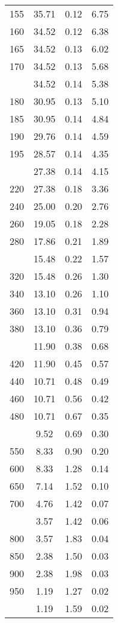 \begin{table}[ht]
\begin{tabular}{lccc}
  155 & 35.71 & 0.12 & 6.75 \\ 
  160 & 34.52 & 0.12 & 6.38 \\ 
  165 & 34.52 & 0.13 & 6.02 \\ 
  170 & 34.52 & 0.13 & 5.68 \\ 
   \addlinespace
175 & 34.52 & 0.14 & 5.38 \\ 
  180 & 30.95 & 0.13 & 5.10 \\ 
  185 & 30.95 & 0.14 & 4.84 \\ 
  190 & 29.76 & 0.14 & 4.59 \\ 
  195 & 28.57 & 0.14 & 4.35 \\ 
   \addlinespace
200 & 27.38 & 0.14 & 4.15 \\ 
  220 & 27.38 & 0.18 & 3.36 \\ 
  240 & 25.00 & 0.20 & 2.76 \\ 
  260 & 19.05 & 0.18 & 2.28 \\ 
  280 & 17.86 & 0.21 & 1.89 \\ 
   \addlinespace
300 & 15.48 & 0.22 & 1.57 \\ 
  320 & 15.48 & 0.26 & 1.30 \\ 
  340 & 13.10 & 0.26 & 1.10 \\ 
  360 & 13.10 & 0.31 & 0.94 \\ 
  380 & 13.10 & 0.36 & 0.79 \\ 
   \addlinespace
400 & 11.90 & 0.38 & 0.68 \\ 
  420 & 11.90 & 0.45 & 0.57 \\ 
  440 & 10.71 & 0.48 & 0.49 \\ 
  460 & 10.71 & 0.56 & 0.42 \\ 
  480 & 10.71 & 0.67 & 0.35 \\ 
   \addlinespace
500 & 9.52 & 0.69 & 0.30 \\ 
  550 & 8.33 & 0.90 & 0.20 \\ 
  600 & 8.33 & 1.28 & 0.14 \\ 
  650 & 7.14 & 1.52 & 0.10 \\ 
  700 & 4.76 & 1.42 & 0.07 \\ 
   \addlinespace
750 & 3.57 & 1.42 & 0.06 \\ 
  800 & 3.57 & 1.83 & 0.04 \\ 
  850 & 2.38 & 1.50 & 0.03 \\ 
  900 & 2.38 & 1.98 & 0.03 \\ 
  950 & 1.19 & 1.27 & 0.02 \\ 
   \addlinespace
1000 & 1.19 & 1.59 & 0.02 \\ 
   \bottomrule
\end{tabular}
\end{table}
